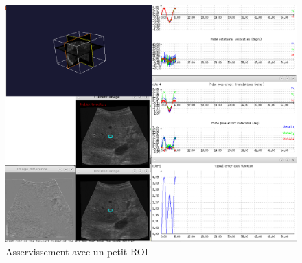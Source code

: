 \documentclass[a4paper,11pt]{article}
\begin{document}
\begin{figure}[H]
    \centering
    \includegraphics[width=0.5\textheight]{./images/q9_small.png}
    \caption{Asservissement avec un petit ROI}
    \label{smallRoi}
\end{figure}
\end{document}
